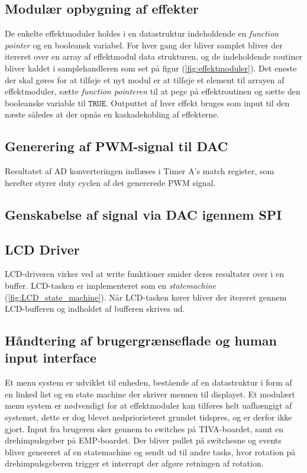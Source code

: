 \subsection{Modulær opbygning af effekter}
De enkelte effektmoduler holdes i en datastruktur indeholdende en \textit{function pointer} og en booleansk variabel.
For hver gang der bliver samplet bliver der itereret over en array af effektmodul data strukturen, og de indeholdende routiner bliver kaldet i samplehandleren som set på figur (\ref{fig:effektmoduler}).\newline
Det eneste der skal gøres for at tilføje et nyt modul er at tilføje et element til arrayen af effektmoduler, sætte \textit{function pointeren} til at pege på effektroutinen og sætte den booleanske variable til $\mathtt{TRUE}$.
Outputtet af hver effekt bruges som input til den næste således at der opnås en kaskadekobling af effekterne.

\subsection{Generering af PWM-signal til DAC}
Resultatet af AD konverteringen indlæses i Timer A's match register, som herefter styrer duty cyclen af det genererede PWM signal. 

\subsection{Genskabelse af signal via DAC igennem SPI}


\subsection{LCD Driver}
LCD-driveren virker ved at write funktioner smider deres resultater over i en buffer.
LCD-tasken er implementeret som en \textit{statemachine} (\ref{fig:LCD_state_machine}).
Når LCD-tasken kører bliver der itereret gennem LCD-bufferen og indholdet af bufferen skrives ud.


\subsection{Håndtering af brugergrænseflade og human input interface}

Et menu system er udviklet til enheden, bestående af en datastruktur i form af en linked list og en state machine der skriver menuen til displayet.
Et modulært menu system er nødvendigt for at effektmoduler kan tilføres helt uafhængigt af systemet, dette er dog blevet nedpriorieteret grundet tidspres, og er derfor ikke gjort.
Input fra brugeren sker gennem to switches på TIVA-boardet, samt en drehimpulsgeber på EMP-boardet.
Der bliver pullet på switchesne og events bliver genereret af en statemachine og sendt ud til andre tasks, hvor rotation på drehimpulsgeberen trigger et interrupt der afgøre retningen af rotation.
